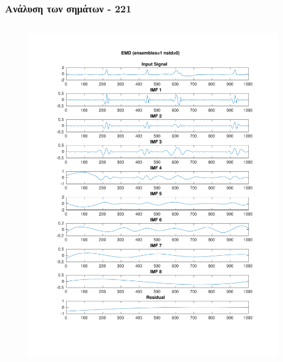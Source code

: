 \documentclass{beamer}
\begin{document}
\begin{frame}
\frametitle{Ανάλυση των σημάτων - 221}

\begin{columns}
\begin{figure}
\includegraphics[width=\textwidth]{fig/221l1_emd.pdf}
\end{figure}


\end{columns}
\end{frame}
\end{document}
